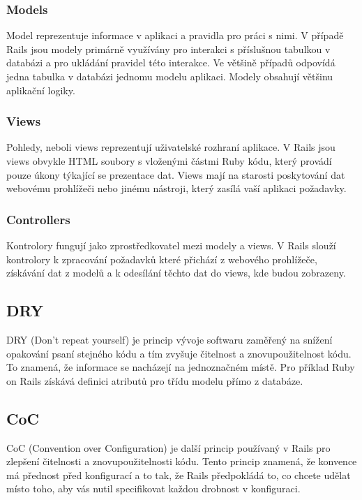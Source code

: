 \subsubsection{Models}
Model reprezentuje informace v aplikaci a pravidla pro práci s nimi. V případě Rails jsou modely primárně využívány pro interakci s příslušnou tabulkou v databázi a pro ukládání pravidel této interakce. Ve většině případů odpovídá jedna tabulka v databázi jednomu modelu aplikaci. Modely obsahují většinu aplikační logiky.

\subsubsection{Views}
Pohledy, neboli views reprezentují uživatelské rozhraní aplikace. V Rails jsou views obvykle HTML soubory s vloženými částmi Ruby kódu, který provádí pouze úkony týkající se prezentace dat. Views mají na starosti poskytování dat webovému prohlížeči nebo jinému nástroji, který zasílá vaší aplikaci požadavky.

\subsubsection{Controllers}
Kontrolory fungují jako zprostředkovatel mezi modely a views. V Rails slouží kontrolory k zpracování požadavků které přichází z webového prohlížeče, získávání dat z modelů a k odesílání těchto dat do views, kde budou zobrazeny.

\subsection{DRY}
\label{dry}
DRY (Don’t repeat yourself) \cite{dry} je princip vývoje softwaru zaměřený na snížení opakování psaní stejného kódu a tím zvyšuje čitelnost a znovupoužitelnost kódu. To znamená, že informace se nacházejí na jednoznačném místě. Pro příklad Ruby on Rails získává definici atributů pro třídu modelu přímo z databáze.  

\subsection{CoC}
\label{coc}
CoC (Convention over Configuration) \cite{coc} je další princip používaný v Rails pro zlepšení čitelnosti a znovupoužitelnosti kódu. Tento princip znamená, že konvence má přednost před konfigurací a to tak, že Rails předpokládá to, co chcete udělat místo toho, aby vás nutil specifikovat každou drobnost v konfiguraci. 

